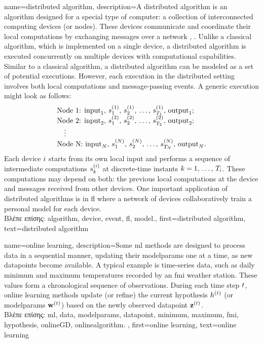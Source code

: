 {name={distributed algorithm},
	description={A distributed \gls{algorithm} is an \gls{algorithm} designed for 
		a special type of computer: a collection of interconnected computing devices (or nodes). 
		These devices communicate and coordinate their local computations by exchanging 
		messages over a network \cite{IntroDistAlg}, \cite{ParallelDistrBook}. Unlike a classical \gls{algorithm}, 
		which is implemented on a single \gls{device}, a distributed \gls{algorithm} is 
		executed concurrently on multiple \gls{device}s with computational capabilities. 
		Similar to a classical \gls{algorithm}, a distributed \gls{algorithm} can be modeled as a 
		set of potential executions. However, each execution in the distributed setting involves 
		both local computations and message-passing \gls{event}s. A generic execution might look as 
		follows:
		\[
		\begin{array}{l}
			\text{Node 1: } {\rm input}_1, \,s_1^{(1)}, \,s_2^{(1)}, \,\ldots, \,s_{T_1}^{(1)}, \,{\rm output}_1; \\
			\text{Node 2: } {\rm input}_2, \,s_1^{(2)}, \,s_2^{(2)}, \,\ldots, \,s_{T_2}^{(2)}, \,{\rm output}_2; \\
			\quad \vdots \\
			\text{Node N: } {\rm input}_N, \,s_1^{(N)}, \,s_2^{(N)}, \,\ldots, \,s_{T_N}^{(N)}, \,{\rm output}_N.
		\end{array}
		\]
		Each \gls{device} $i$ starts from its own local input and performs a sequence of 
		intermediate computations $s_{k}^{(i)}$ at discrete-time instants $k = 1, \,\dots, \,T_i$. 
		These computations may depend on both: the previous local computations at the \gls{device} 
		and messages received from other \gls{device}s. One important application of distributed 
		\gls{algorithm}s is in \gls{fl} where a network of \gls{device}s collaboratively train a personal \gls{model} 
		for each \gls{device}.\\
		\foreignlanguage{greek}{Βλέπε επίσης:} \gls{algorithm}, \gls{device}, \gls{event}, \gls{fl}, \gls{model}.},
	first={distributed algorithm}, 
	text={distributed algorithm}
}

{name={online learning},
	description={Some \gls{ml} methods  are designed to process \gls{data} in a sequential 
		manner, updating their \gls{modelparams} one at a time, as new \gls{datapoint}s become available. 
		A typical example is time-series \gls{data}, such as daily \gls{minimum} and \gls{maximum} temperatures 
		recorded by an \gls{fmi} weather station. These values form a chronological sequence 
		of observations. During each time step $t$, online learning methods update (or refine)  
		the current \gls{hypothesis} $h^{(t)}$ (or \gls{modelparams} ${\bf w}^{(t)}$) 
		based on the newly observed \gls{datapoint} ${\bf z}^{(t)}$.  \\ 
		\foreignlanguage{greek}{Βλέπε επίσης:} \gls{ml}, \gls{data}, \gls{modelparams}, \gls{datapoint}, 
		\gls{minimum}, \gls{maximum}, \gls{fmi}, \gls{hypothesis}, \gls{onlineGD}, \gls{onlinealgorithm}.  },
	first={online learning},
	text={online learning} 
}


